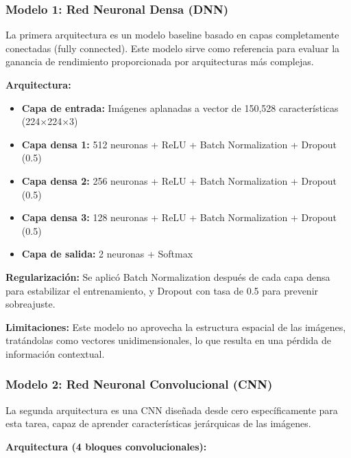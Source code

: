 \documentclass[11pt, a4paper]{article}
\begin{document}
\subsubsection{Modelo 1: Red Neuronal Densa (DNN)}

La primera arquitectura es un modelo baseline basado en capas completamente conectadas (fully connected). Este modelo sirve como referencia para evaluar la ganancia de rendimiento proporcionada por arquitecturas más complejas.

\textbf{Arquitectura:}
\begin{itemize}
    \item \textbf{Capa de entrada:} Imágenes aplanadas a vector de 150,528 características (224$\times$224$\times$3)
    \item \textbf{Capa densa 1:} 512 neuronas + ReLU + Batch Normalization + Dropout (0.5)
    \item \textbf{Capa densa 2:} 256 neuronas + ReLU + Batch Normalization + Dropout (0.5)
    \item \textbf{Capa densa 3:} 128 neuronas + ReLU + Batch Normalization + Dropout (0.5)
    \item \textbf{Capa de salida:} 2 neuronas + Softmax
\end{itemize}

\textbf{Regularización:} Se aplicó Batch Normalization después de cada capa densa para estabilizar el entrenamiento, y Dropout con tasa de 0.5 para prevenir sobreajuste.

\textbf{Limitaciones:} Este modelo no aprovecha la estructura espacial de las imágenes, tratándolas como vectores unidimensionales, lo que resulta en una pérdida de información contextual.

\subsubsection{Modelo 2: Red Neuronal Convolucional (CNN)}

La segunda arquitectura es una CNN diseñada desde cero específicamente para esta tarea, capaz de aprender características jerárquicas de las imágenes.

\textbf{Arquitectura (4 bloques convolucionales):}
\end{document}
